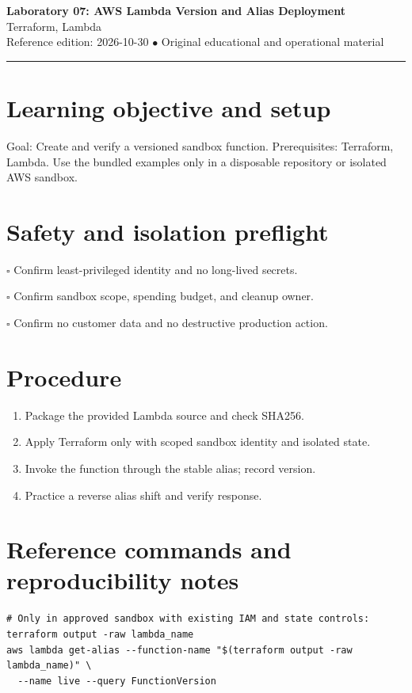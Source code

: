 \documentclass[10pt,letterpaper]{article}
\begin{document}
\begin{center}
{\LARGE\bfseries\color{cdblue}Laboratory 07: AWS Lambda Version and Alias Deployment}\\[7pt]
{\large Terraform, Lambda}\\[6pt]
{\small Reference edition: 2026-10-30 $\bullet$ Original educational and operational material}
\end{center}
\noindent\color{cdblue}\rule{\linewidth}{1.2pt}\color{black}
\vspace{0.4em}
\section{Learning objective and setup}
Goal: Create and verify a versioned sandbox function. Prerequisites: Terraform, Lambda. Use the bundled examples only in a disposable repository or isolated AWS sandbox.


\section{Safety and isolation preflight}
\noindent $\square$ Confirm least-privileged identity and no long-lived secrets.\par\vspace{0.35em}
\noindent $\square$ Confirm sandbox scope, spending budget, and cleanup owner.\par\vspace{0.35em}
\noindent $\square$ Confirm no customer data and no destructive production action.\par\vspace{0.35em}

\section{Procedure}
\begin{enumerate}
\item Package the provided Lambda source and check SHA256.
\item Apply Terraform only with scoped sandbox identity and isolated state.
\item Invoke the function through the stable alias; record version.
\item Practice a reverse alias shift and verify response.
\end{enumerate}

\section{Reference commands and reproducibility notes}
\begin{verbatim}
# Only in approved sandbox with existing IAM and state controls:
terraform output -raw lambda_name
aws lambda get-alias --function-name "$(terraform output -raw lambda_name)" \
  --name live --query FunctionVersion
\end{verbatim}
\end{document}
